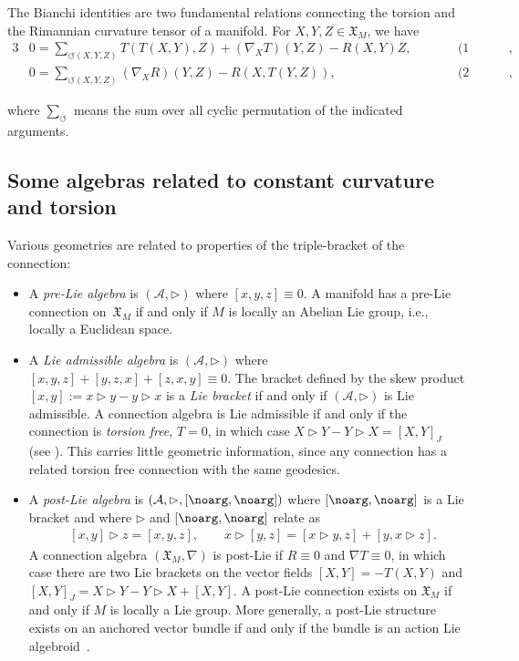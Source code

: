 \documentclass[pdftex]{sigma}
\numberwithin{equation}{section}
\begin{document}
The Bianchi identities are two fundamental relations connecting the torsion and the Rimannian curvature tensor of a manifold. For $X,Y,Z \in \mathfrak{X}_M$, we have
\begin{alignat*}{3}%
& 0= \sum_{\circlearrowleft (X,Y,Z)} T(T(X,Y),Z) + (\nabla_X T)(Y,Z) - R(X,Y)Z , \qquad && \mbox{(1 Bianchi)},&\\
&0= \sum_{\circlearrowleft (X,Y,Z)} (\nabla_X R)(Y,Z) - R(X,T(Y,Z)) , && \mbox{(2 Bianchi)},& %
\end{alignat*}

where $\sum_{\circlearrowleft}$ means the sum over all cyclic permutation of the indicated arguments.

\subsection{Some algebras related to constant curvature and torsion}

Various geometries are related to properties of the triple-bracket of the connection:
\begin{itemize}\itemsep=0pt
 \item A \emph{pre-Lie algebra} is $(\mathcal{A},\rhd)$ where $[x,y,z] \equiv 0$. A manifold has a pre-Lie connection on~$\mathfrak{X}_M$ if and only if $M$ is locally an Abelian Lie group, i.e., locally a Euclidean space.
 \item A \emph{Lie admissible algebra} is $(\mathcal{A},\rhd)$ where $[x,y,z]+[y,z,x] + [z,x,y]\equiv 0$. The bracket defined by the skew product $[x,y] := x\rhd y - y\rhd x$ is a \emph{Lie bracket} if and only if $(\mathcal{A},\rhd)$ is Lie admissible. A connection algebra is Lie admissible if and only if the connection is \emph{torsion free}, $T=0$, in which case $X\rhd Y -Y\rhd X = [X,Y]_J$ (see \cite[Proposition 2.13]{MK_Stern_Verdier_20}). This carries little geometric information, since any connection has a related torsion free connection with the same geodesics.
 \item A \emph{post-Lie algebra} is $(\mathcal{A},\rhd,[\noarg,\noarg])$ where $[\noarg,\noarg]$ is a Lie bracket and where $\rhd$ and $[\noarg,\noarg]$ relate as
 \begin{align*}
 & [x,y]\rhd z= [x,y,z],\qquad x\rhd [y,z]= [x\rhd y,z]+ [y,x\rhd z].
 \end{align*}
 A connection algebra $(\mathfrak{X}_M,\nabla)$ is post-Lie if $R\equiv 0$ and $\nabla T\equiv 0$, in which case there are two Lie brackets on the vector fields $[X,Y] = -T(X,Y)$ and $[X,Y]_J = X\rhd Y-Y\rhd X + [X,Y]$. A post-Lie connection exists on $\mathfrak{X}_M$ if and only if $M$ is locally a Lie group. More generally, a post-Lie structure exists on an anchored vector bundle if and only if the bundle is an action Lie algebroid~\cite{MK_Lundervold_2013}.%
\end{itemize}
\end{document}
